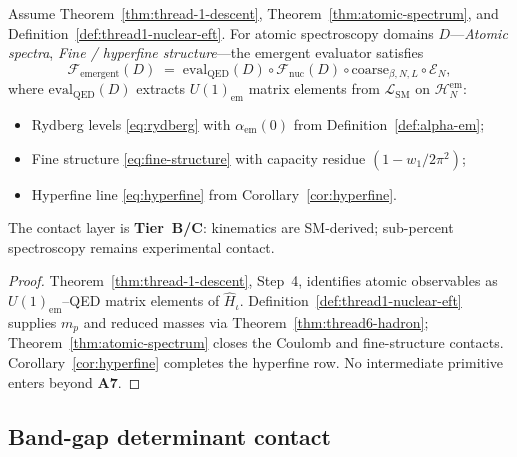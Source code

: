 \begin{corollary}
\label{cor:thread-1-qed}
Assume Theorem~\ref{thm:thread-1-descent},
Theorem~\ref{thm:atomic-spectrum}, and Definition~\ref{def:thread1-nuclear-eft}.
For atomic spectroscopy domains $D$---\emph{Atomic spectra},
\emph{Fine / hyperfine structure}---the emergent evaluator satisfies
\begin{equation}\label{eq:thread1-qed-contact}
  \mathcal{F}_{\mathrm{emergent}}(D)
  \;=\;
  \mathrm{eval}_{\mathrm{QED}}(D)
  \circ
  \mathcal{F}_{\mathrm{nuc}}(D)
  \circ
  \mathrm{coarse}_{\beta,N,L}
  \circ
  \mathcal{E}_N,
\end{equation}
where $\mathrm{eval}_{\mathrm{QED}}(D)$ extracts $U(1)_{\mathrm{em}}$ matrix
elements from $\mathcal{L}_{\mathrm{SM}}$ on $\mathcal{H}_N^{\mathrm{em}}$:
\begin{itemize}[leftmargin=*]
  \item Rydberg levels \eqref{eq:rydberg} with
    $\alpha_{\mathrm{em}}(0)$ from Definition~\ref{def:alpha-em};
  \item Fine structure \eqref{eq:fine-structure} with capacity residue
    $(1-w_1/2\pi^2)$;
  \item Hyperfine line \eqref{eq:hyperfine} from Corollary~\ref{cor:hyperfine}.
\end{itemize}
The contact layer is \textbf{Tier~B/C}: kinematics are SM-derived; sub-percent
spectroscopy remains experimental contact.
\end{corollary}

\begin{proof}
Theorem~\ref{thm:thread-1-descent}, Step~4, identifies atomic observables as
$U(1)_{\mathrm{em}}$--QED matrix elements of $\hat H_\iota$.
Definition~\ref{def:thread1-nuclear-eft} supplies $m_p$ and reduced masses via
Theorem~\ref{thm:thread6-hadron}; Theorem~\ref{thm:atomic-spectrum} closes the
Coulomb and fine-structure contacts. Corollary~\ref{cor:hyperfine} completes
the hyperfine row. No intermediate primitive enters beyond \textbf{A7}.
\end{proof}

\subsection{Band-gap determinant contact}
\label{sec:wave4-thread1:bands}

